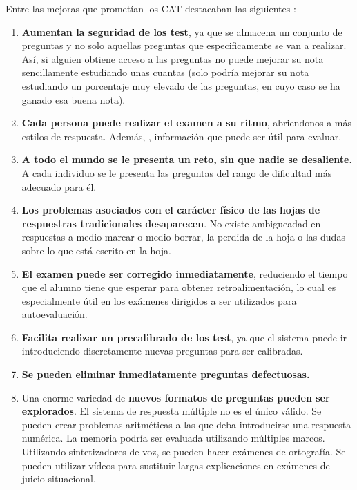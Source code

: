 Entre las mejoras que prometían los \acrshort{CAT} destacaban las siguientes \cite{Green83}:

\begin{enumerate}
	\item \textbf{Aumentan la seguridad de los test}, ya que se almacena un conjunto de preguntas y no solo aquellas preguntas que especificamente se van a realizar. Así, si alguien obtiene acceso a las preguntas no puede mejorar su nota sencillamente estudiando unas cuantas (solo podría mejorar su nota estudiando un porcentaje muy elevado de las preguntas, en cuyo caso se ha ganado esa buena nota).
	\item \textbf{Cada persona puede realizar el examen a su ritmo}, abriendonos a más estilos de respuesta. Además, , información que puede ser útil para evaluar.
	\item \textbf{A todo el mundo se le presenta un reto, sin que nadie se desaliente}. A cada individuo se le presenta las preguntas del rango de dificultad más adecuado para él.
	\item \textbf{Los problemas asociados con el carácter físico de las hojas de respuestras tradicionales desaparecen}. No existe ambigueadad en respuestas a medio marcar o medio borrar, la perdida de la hoja o las dudas sobre lo que está escrito en la hoja.
	\item \textbf{El examen puede ser corregido inmediatamente}, reduciendo el tiempo que el alumno tiene que esperar para obtener retroalimentación, lo cual es especialmente útil en los exámenes dirigidos a ser utilizados para autoevaluación.
	\item \textbf{Facilita realizar un precalibrado de los test}, ya que el sistema puede ir introduciendo discretamente nuevas preguntas para ser calibradas.
	\item \textbf{Se pueden eliminar inmediatamente preguntas defectuosas.}
	\item Una enorme variedad de \textbf{nuevos formatos de preguntas pueden ser explorados}. El sistema de respuesta múltiple no es el único válido. Se pueden crear problemas aritméticas a las que deba introducirse una respuesta numérica. La memoria podría ser evaluada utilizando múltiples marcos. Utilizando sintetizadores de voz, se pueden hacer exámenes de ortografía. Se pueden utilizar vídeos para sustituir largas explicaciones en exámenes de juicio situacional.
\end{enumerate}

